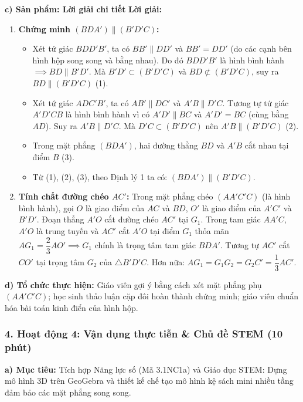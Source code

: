 \documentclass[12pt, a4paper]{article}
\begin{document}
\noindent \textbf{c) Sản phẩm: Lời giải chi tiết}
\textbf{Lời giải:}
\begin{enumerate}[leftmargin=0.6cm]
    \item \textbf{Chứng minh $(BDA') \parallel (B'D'C)$:}
    \begin{itemize}
        \item Xét tứ giác $BDD'B'$, ta có $BB' \parallel DD'$ và $BB' = DD'$ (do các cạnh bên hình hộp song song và bằng nhau). Do đó $BDD'B'$ là hình bình hành $\implies BD \parallel B'D'$.
        Mà $B'D' \subset (B'D'C)$ và $BD \not\subset (B'D'C)$, suy ra $BD \parallel (B'D'C)$ (1).
        \item Xét tứ giác $ADC'B'$, ta có $AB' \parallel DC'$ và $A'B \parallel D'C$. Tương tự tứ giác $A'D'CB$ là hình bình hành vì có $A'D' \parallel BC$ và $A'D' = BC$ (cùng bằng $AD$).
        Suy ra $A'B \parallel D'C$. Mà $D'C \subset (B'D'C)$ nên $A'B \parallel (B'D'C)$ (2).
        \item Trong mặt phẳng $(BDA')$, hai đường thẳng $BD$ và $A'B$ cắt nhau tại điểm $B$ (3).
        \item Từ (1), (2), (3), theo Định lý 1 ta có: $(BDA') \parallel (B'D'C)$.
    \end{itemize}

    \item \textbf{Tính chất đường chéo $AC'$:}
    Trong mặt phẳng chéo $(AA'C'C)$ (là hình bình hành), gọi $O$ là giao điểm của $AC$ và $BD$, $O'$ là giao điểm của $A'C'$ và $B'D'$.
    Đoạn thẳng $A'O$ cắt đường chéo $AC'$ tại $G_1$. Trong tam giác $AA'C$, $A'O$ là trung tuyến và $AC'$ cắt $A'O$ tại điểm $G_1$ thỏa mãn $AG_1 = \dfrac{2}{3} AO' \implies G_1$ chính là trọng tâm tam giác $BDA'$. Tương tự $AC'$ cắt $CO'$ tại trọng tâm $G_2$ của $\triangle B'D'C$. Hơn nữa: $AG_1 = G_1G_2 = G_2C' = \dfrac{1}{3} AC'$.
\end{enumerate}

\noindent \textbf{d) Tổ chức thực hiện:}
Giáo viên gợi ý bằng cách xét mặt phẳng phụ $(AA'C'C)$; học sinh thảo luận cặp đôi hoàn thành chứng minh; giáo viên chuẩn hóa bài toán kinh điển của hình hộp.

\subsubsection*{4. Hoạt động 4: Vận dụng thực tiễn & Chủ đề STEM (10 phút)}

\noindent \textbf{a) Mục tiêu:}
Tích hợp Năng lực số (Mã 3.1NC1a) và Giáo dục STEM: Dựng mô hình 3D trên GeoGebra và thiết kế chế tạo mô hình kệ sách mini nhiều tầng đảm bảo các mặt phẳng song song.
\end{document}
